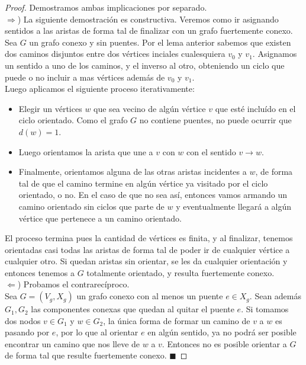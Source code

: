 \begin{proof}
Demostramos ambas implicaciones por separado. \\
$\Rightarrow$)
La siguiente demostración es constructiva. Veremos como ir asignando sentidos a las aristas de forma tal de finalizar con un grafo fuertemente conexo. \\
Sea $G$ un grafo conexo y sin puentes. Por el lema anterior sabemos que existen dos caminos disjuntos entre dos vértices inciales cualesquiera $v_0$ y $v_1$. 
Asignamos un sentido a uno de los caminos, y el inverso al otro, obteniendo un ciclo que puede o no incluir a mas vértices además de $v_0$ y $v_1$. \\
Luego aplicamos el siguiente proceso iterativamente:\\
\begin{itemize}
  \item Elegir un vértices $w$ que sea vecino de algún vértice $v$ que esté incluído en el ciclo orientado. Como el grafo $G$ no contiene puentes, no puede ocurrir que $d(w)=1$.
  \item Luego orientamos la arista que une a $v$ con $w$ con el sentido $v\rightarrow w$.
  \item Finalmente, orientamos alguna de las otras aristas incidentes a $w$, de forma tal de que el camino termine en algún vértice ya visitado por el ciclo orientado, o no. En el caso de que 
	no sea así, entonces vamos armando un camino orientado sin ciclos que parte de $w$ y eventualmente llegará a algún vértice que pertenece a un camino orientado.
\end{itemize}
El proceso termina pues la cantidad de vértices es finita, y al finalizar, tenemos orientadas casi todas las aristas de forma tal de poder ir de cualquier vértice a cualquier otro. Si quedan 
aristas sin orientar, se les da cualquier orientación y entonces tenemos a $G$ totalmente orientado, y resulta fuertemente conexo. \\ 

$\Leftarrow$)
Probamos el contrarecíproco.\\
Sea $G=(V_g, X_g)$ un grafo conexo con al menos un puente $e \in X_g$. Sean además $G_1, G_2$ las componentes conexas que quedan al quitar el puente $e$. Si tomamos dos nodos $v \in G_1$ y 
$w \in G_2$, la única forma de formar un camino de $v$ a $w$ es pasando por $e$, por lo que al orientar $e$ en algún sentido, ya no podrá ser posible encontrar un camino que nos lleve de $w$ a $v$. 
Entonces no es posible orientar a $G$ de forma tal que resulte fuertemente conexo. $\blacksquare$
\end{proof}

